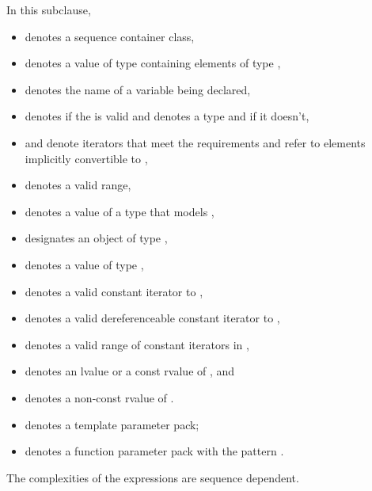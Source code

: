 \pnum
In this subclause,
\begin{itemize}
\item
{} denotes a sequence container class,
\item
{} denotes a value of type  containing elements of type ,
\item
{} denotes the name of a variable being declared,
\item
{} denotes  if
the   is valid and denotes a
type and
 if it doesn't,
\item
{} and 
denote iterators that meet the  requirements
and refer to elements implicitly convertible to ,
\item
{} denotes a valid range,
\item
{} denotes a value of a type 
that models ,
\item
{} designates an object of type ,
\item
{} denotes a value of type ,
\item
{} denotes a valid constant iterator to ,
\item
{} denotes a valid dereferenceable constant iterator to ,
\item
{} denotes a valid range of constant iterators in ,
\item
{} denotes an lvalue or a const rvalue of , and
\item
{} denotes a non-const rvalue of .
\item
{} denotes a template parameter pack;
\item
{} denotes a function parameter pack with the pattern .
\end{itemize}

\pnum
The complexities of the expressions are sequence dependent.

\renewcommand{\indexcont}[1]{%
\indexlibrarymisc{\idxcode{#1}}{sequence containers}%
\indexlibrarymemberx{deque}{#1}%
\indexlibrarymemberx{forward_list}{#1}%
\indexlibrarymemberx{list}{#1}%
\indexlibrarymemberx{vector}{#1}%
}


